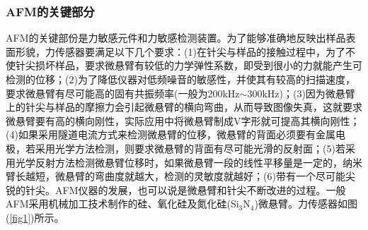 \documentclass[a4paper]{article}
\begin{document}
\subsubsection{AFM的关键部分}
AFM的关键部份是力敏感元件和力敏感检测装置。为了能够准确地反映出样品表面形貌，力传感器要满足以下几个要求：(1)在针尖与样品的接触过程中，为了不使针尖损坏样品，要求微悬臂有较低的力学弹性系数，即受到很小的力就能产生可检测的位移；(2)为了降低仪器对低频噪音的敏感性，并使其有较高的扫描速度，要求微悬臂有尽可能高的固有共振频率(一般为200kHz$\sim$300kHz)；(3)因为微悬臂上的针尖与样品的摩擦力会引起微悬臂的横向弯曲，从而导致图像失真，这就要求微悬臂要有高的横向刚性，实际应用中将微悬臂制成V字形就可提高其横向刚性；(4)如果采用隧道电流方式来检测微悬臂的位移，微悬臂的背面必须要有金属电极，若采用光学方法检测，则要求微悬臂的背面有尽可能光滑的反射面；(5)若采用光学反射方法检测微悬臂位移时，如果微悬臂一段的线性平移量是一定的，纳米臂长越短，微悬臂的弯曲度就越大，检测的灵敏度就越好；(6)带有一个尽可能尖锐的针尖。AFM仪器的发展，也可以说是微悬臂和针尖不断改进的过程。一般AFM采用机械加工技术制作的硅、氧化硅及氮化硅(Si$_3$N$_4$)微悬臂。力传感器如图(\ref{fig1})所示。
\end{document}
